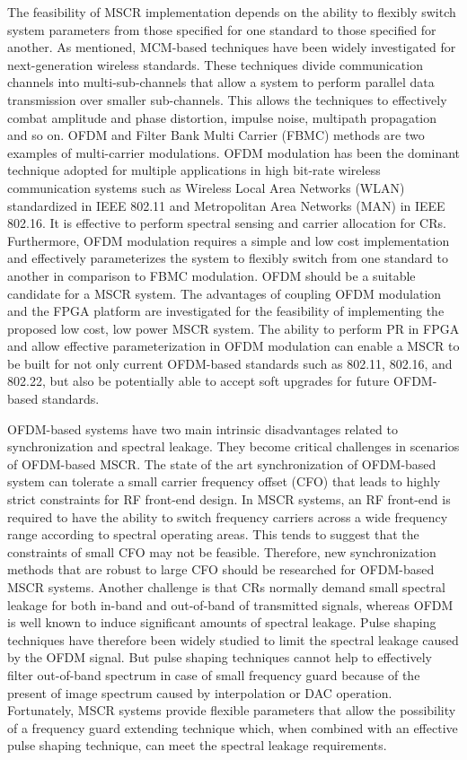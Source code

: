 The feasibility of MSCR implementation depends on the ability to flexibly switch system parameters from those specified for one standard to those specified for another.
As mentioned, MCM-based techniques have been widely investigated for next-generation wireless standards.
These techniques divide communication channels into multi-sub-channels that allow a system to perform parallel data transmission over smaller sub-channels.
This allows the techniques to effectively combat amplitude and phase distortion, impulse noise, multipath propagation and so on.
OFDM and Filter Bank Multi Carrier (FBMC) methods are two examples  of multi-carrier modulations.
OFDM modulation has been the dominant technique adopted for multiple applications in high bit-rate wireless communication systems such as Wireless Local Area Networks (WLAN) standardized in IEEE 802.11 and Metropolitan Area Networks (MAN) in IEEE 802.16.
It is effective to perform spectral sensing and carrier allocation for CRs.
Furthermore, OFDM modulation requires a simple and low cost implementation and effectively parameterizes the system to flexibly switch from one standard to another in comparison to FBMC modulation.
OFDM should be a suitable candidate for a MSCR system.
The advantages of coupling OFDM modulation and the FPGA platform are investigated for the feasibility of implementing the proposed low cost, low power MSCR system.
The ability to perform PR in FPGA and allow effective parameterization in OFDM modulation can enable a MSCR to be built for not only current OFDM-based standards such as 802.11, 802.16, and 802.22, but also be potentially able to accept soft upgrades for future OFDM-based standards.

OFDM-based systems have two main intrinsic disadvantages related to synchronization and spectral leakage. They become critical challenges in scenarios of OFDM-based MSCR.
The state of the art synchronization of OFDM-based system can tolerate a small carrier frequency offset (CFO) that leads to highly strict constraints for RF front-end design.
In MSCR systems, an RF front-end is required to have the ability to switch frequency carriers across a wide frequency range according to spectral operating areas.  This tends to suggest that the constraints of small CFO may not be feasible.
Therefore, new synchronization methods that are robust to large CFO should be researched for OFDM-based MSCR systems.
Another challenge is that CRs normally demand small spectral leakage for both in-band and out-of-band of transmitted signals, whereas OFDM is well known to induce significant amounts of spectral leakage.
Pulse shaping techniques have therefore been widely studied to limit the spectral leakage caused by the OFDM signal.
But pulse shaping techniques cannot help to effectively filter out-of-band spectrum in case of small frequency guard because of the present of image spectrum caused by interpolation or DAC operation.
Fortunately, MSCR systems provide flexible parameters that allow the possibility of a frequency guard extending technique which, when combined with an effective pulse shaping technique, can meet the spectral leakage requirements.

